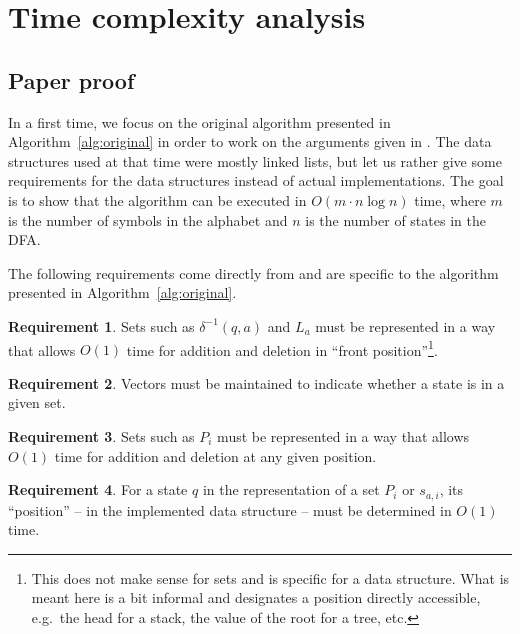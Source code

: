\documentclass[12pt, a4 paper]{article}
\theoremstyle{definition}
\newtheorem{requirement}{Requirement}
\begin{document}
\section{Time complexity analysis}

\subsection{Paper proof}

In a first time, we focus on the original algorithm presented in Algorithm~\ref{alg:original} in order to work on the arguments given in \cite{Hop71}. The data structures used at that time were mostly linked lists, but let us rather give some requirements for the data structures instead of actual implementations. The goal is to show that the algorithm can be executed in $O(m \cdot n \log n)$ time, where $m$ is the number of symbols in the alphabet and $n$ is the number of states in the DFA.

The following requirements come directly from \cite{Hop71} and are specific to the algorithm presented in Algorithm~\ref{alg:original}.

\begin{requirement}
    \label{req:1}
Sets such as $\delta^{-1}(q, a)$ and $L_a$ must be represented in a way that allows $O(1)$ time for addition and deletion in ``front position''\footnote{This does not make sense for sets and is specific for a data structure. What is meant here is a bit informal and designates a position directly accessible, e.g.\ the head for a stack, the value of the root for a tree, etc.}.
\end{requirement}

\begin{requirement}
    \label{req:2}
Vectors must be maintained to indicate whether a state is in a given set.
\end{requirement}

\begin{requirement}
    \label{req:3}
Sets such as $P_i$ must be represented in a way that allows $O(1)$ time for addition and deletion at any given position.
\end{requirement}

\begin{requirement}
    \label{req:4}
For a state $q$ in the representation of a set $P_i$ or $s_{a,i}$, its ``position'' -- in the implemented data structure -- must be determined in $O(1)$ time.
\end{requirement}
\end{document}
